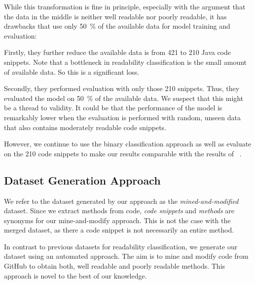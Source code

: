 \documentclass[%
class=scrreprt,
chapterprefix=false,%
open=right,%
twoside=false,%
paper=a4,%
logofile={Logo\_zentral\_farbig\_EN.png},%
thesistype=master,%
UKenglish,%
]{se2thesis}
\theoremstyle{definition}
\begin{document}
	While this transformation is fine in principle, especially with the argument that the data in the middle is neither well readable nor poorly readable, it has drawbacks that \citeauthor{mi2022towards} use only 50~\% of the available data for model training and evaluation:
	
	Firstly, they further reduce the available data is from 421 to 210 Java code snippets. Note that a bottleneck in readability classification is the small amount of available data. So this is a significant loss.
	
	Secondly, they performed evaluation with only those 210 snippets. Thus, they evaluated the model on 50~\% of the available data. We suspect that this might be a thread to validity. It could be that the performance of the model is remarkably lower when the evaluation is performed with random, unseen data that also contains moderately readable code snippets.
	
	However, we continue to use the binary classification approach as well as evaluate on the 210 code snippets to make our results comparable with the results of \citeauthor{mi2022towards}~\cite{mi2022towards}.
	
\subsection{Dataset Generation Approach} \label{Dataset Generation Approach}
	We refer to the dataset generated by our approach as the \textit{mined-and-modified} dataset.
	Since we extract methods from code, \textit{code snippets} and \textit{methods} are synonyms for our mine-and-modify approach. This is not the case with the merged dataset, as there a code snippet is not necessarily an entire method.

	In contrast to previous datasets for readability classification, we generate our dataset using an automated approach. The aim is to mine and modify code from GitHub to obtain both, well readable and poorly readable methods. This approach is novel to the best of our knowledge. 
	
\end{document}
